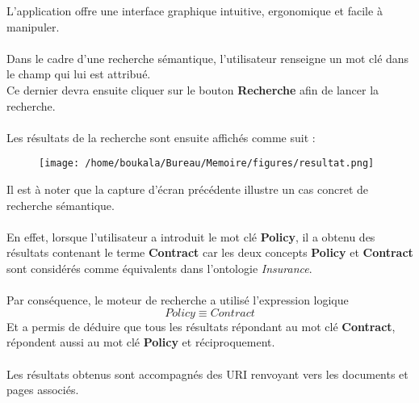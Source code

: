 \documentclass[12pt, a4paper, oneside]{book}
\begin{document}
L'application offre une interface graphique intuitive, ergonomique et facile à manipuler.

\paragraph{}
Dans le cadre d'une recherche sémantique, l'utilisateur renseigne un mot clé dans le champ qui lui est attribué.\\
Ce dernier devra ensuite cliquer sur le bouton \textbf{Recherche} afin de lancer la recherche.

\paragraph{}
Les résultats de la recherche sont ensuite affichés comme suit : 

\begin{figure}[h!]
\begin{center}
\texttt{[image: /home/boukala/Bureau/Memoire/figures/resultat.png]}
\label{resultat}
\end{center}
\end{figure}

Il est à noter que la capture d'écran précédente illustre un cas concret de recherche sémantique.

\paragraph{}
En effet, lorsque l'utilisateur a introduit le mot clé \textbf{Policy}, il a obtenu des résultats contenant le terme \textbf{Contract} car les deux concepts \textbf{Policy} et \textbf{Contract} sont considérés comme équivalents dans l'ontologie \emph{Insurance}.

\paragraph{}
Par conséquence, le moteur de recherche a utilisé l'expression logique $$Policy \equiv Contract$$
Et a permis de déduire que tous les résultats répondant au mot clé \textbf{Contract}, répondent aussi au mot clé \textbf{Policy} et réciproquement.

\paragraph{}
Les résultats obtenus sont accompagnés des URI renvoyant vers les documents et pages associés.
\end{document}
